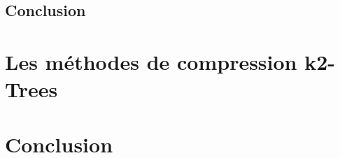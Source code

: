 \documentclass[11pt,a4paper]{report}
\theoremstyle{definition}
\newtheorem{defn}{Definition}[section]
\begin{document}
			 
			 
			 
			 
			 
			 
			
		\section{Conclusion}


	\chapter{Les méthodes de compression k2-Trees}
	
	
	
	
	
	

\chapter{Conclusion} 




\newpage


\end{document}
